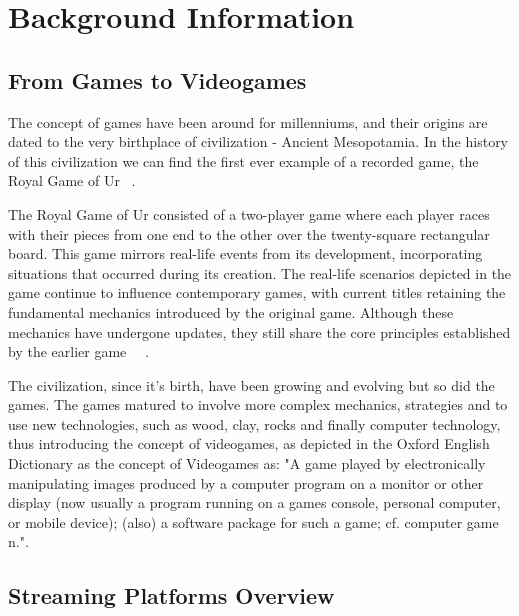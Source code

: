 
\section{Background Information}
\subsection{From Games to Videogames}    
    The concept of games have been around for millenniums, and their origins are dated to the very birthplace of civilization - Ancient Mesopotamia. In the history of this civilization we can find the first ever example of a recorded game, the Royal Game of Ur ~\cite{Videogames_IntroductionToTheIndutry}.

    The Royal Game of Ur consisted of a two-player game where each player races with their pieces from one end to the other over the twenty-square rectangular board. This game mirrors real-life events from its development, incorporating situations that occurred during its creation. The real-life scenarios depicted in the game continue to influence contemporary games, with current titles retaining the fundamental mechanics introduced by the original game. Although these mechanics have undergone updates, they still share the core principles established by the earlier game ~\cite{Videogames_IntroductionToTheIndutry}~\cite{RoyalGameUr_rules}.

    The civilization, since it's birth, have been growing and evolving but so did the games. The games matured to involve more complex mechanics, strategies and to use new technologies, such as wood, clay, rocks and finally computer technology, thus introducing the concept of videogames, as depicted in the Oxford English Dictionary as the concept of Videogames as: "A game played by electronically manipulating images produced by a computer program on a monitor or other display (now usually a program running on a games console, personal computer, or mobile device); (also) a software package for such a game; cf. computer game n."\cite{videogame_oed}.
    
\subsection{Streaming Platforms Overview}

